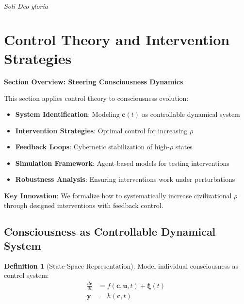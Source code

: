 \documentclass[11pt,a4paper]{article}
\theoremstyle{definition}
\newtheorem{definition}{Definition}[section]
\theoremstyle{remark}
\newcommand{\cc}{\mathbf{c}}
\begin{document}
\begin{small}
\begin{enumerate}
\begin{center}
\textit{Soli Deo gloria}
\end{center}


\section{Control Theory and Intervention Strategies}

\begin{mdframed}[backgroundcolor=cyan!5,linewidth=2pt]
\textbf{Section Overview: Steering Consciousness Dynamics}

This section applies control theory to consciousness evolution:

\begin{itemize}[nosep]
    \item \textbf{System Identification}: Modeling \(\cc(t)\) as controllable dynamical system
    \item \textbf{Intervention Strategies}: Optimal control for increasing \(\rho\)
    \item \textbf{Feedback Loops}: Cybernetic stabilization of high-\(\rho\) states
    \item \textbf{Simulation Framework}: Agent-based models for testing interventions
    \item \textbf{Robustness Analysis}: Ensuring interventions work under perturbations
\end{itemize}

\textbf{Key Innovation}: We formalize how to systematically increase civilizational \(\rho\) through designed interventions with feedback control.
\end{mdframed}

\subsection{Consciousness as Controllable Dynamical System}

\begin{definition}[State-Space Representation]
Model individual consciousness as control system:
\begin{align}
\frac{d\cc}{dt} &= f(\cc, \mathbf{u}, t) + \boldsymbol{\xi}(t) \\
\mathbf{y} &= h(\cc, t)
\end{align}


\end{definition}
\end{enumerate}
\end{small}
\end{document}

